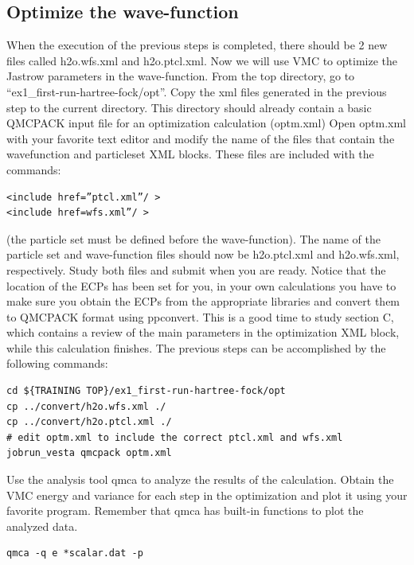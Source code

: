 \subsection{Optimize the wave-function}
When the execution of the previous steps is completed, there should be 2 new
files called h2o.wfs.xml and h2o.ptcl.xml. Now we will use VMC to optimize the 
Jastrow parameters in the wave-function.  From the top directory, go to
``ex1\_first-run-hartree-fock/opt''. Copy the xml files generated in the previous step
to the current directory. This directory should already contain a basic QMCPACK input
file for an optimization calculation (optm.xml) %
Open optm.xml with your favorite text editor and modify the name of the files that contain the
wavefunction and particleset XML blocks. These files are included with the commands:
\begin{shaded}
\begin{verbatim}
<include href=”ptcl.xml”/ >
<include href=wfs.xml”/ >
\end{verbatim}
\end{shaded}
(the particle set must be
defined before the wave-function). The name of the particle set and wave-function files should now be h2o.ptcl.xml
and h2o.wfs.xml, respectively. Study both files and submit when you are ready. Notice that the
location of the ECPs has been set for you, in your own calculations you have to make
sure you obtain the ECPs from the appropriate libraries and convert them to QMCPACK
format using ppconvert. This is a good time to study section C, which contains a review
of the main parameters in the optimization XML block, while this calculation finishes. The
previous steps can be accomplished by the following commands:
\begin{shaded}
\begin{verbatim}
cd ${TRAINING TOP}/ex1_first-run-hartree-fock/opt
cp ../convert/h2o.wfs.xml ./
cp ../convert/h2o.ptcl.xml ./
# edit optm.xml to include the correct ptcl.xml and wfs.xml
jobrun_vesta qmcpack optm.xml
\end{verbatim}
\end{shaded}

Use the analysis tool qmca to analyze the results of the calculation. Obtain the VMC
energy and variance for each step in the optimization and plot it using your favorite program.
Remember that qmca has built-in functions to plot the analyzed data.
\begin{shaded}
\begin{verbatim}
qmca -q e *scalar.dat -p
\end{verbatim}
\end{shaded}

